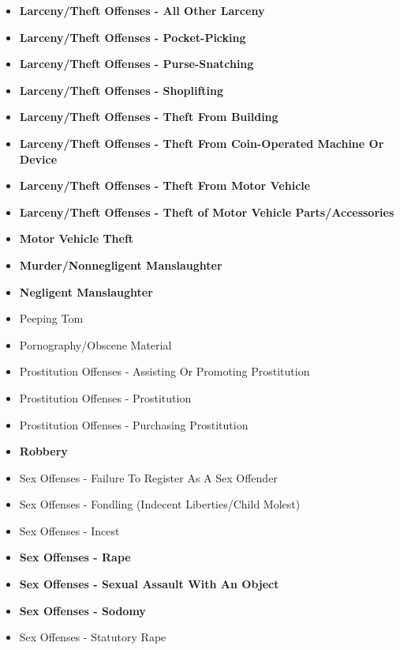 \documentclass[
]{krantz}
\begin{document}
\begin{itemize}
\item
  \textbf{Larceny/Theft Offenses - All Other Larceny}
\item
  \textbf{Larceny/Theft Offenses - Pocket-Picking}
\item
  \textbf{Larceny/Theft Offenses - Purse-Snatching}
\item
  \textbf{Larceny/Theft Offenses - Shoplifting}
\item
  \textbf{Larceny/Theft Offenses - Theft From Building}
\item
  \textbf{Larceny/Theft Offenses - Theft From Coin-Operated
  Machine Or Device}
\item
  \textbf{Larceny/Theft Offenses - Theft From Motor Vehicle}
\item
  \textbf{Larceny/Theft Offenses - Theft of Motor Vehicle
  Parts/Accessories}\\
\item
  \textbf{Motor Vehicle Theft}
\item
  \textbf{Murder/Nonnegligent Manslaughter}
\item
  \textbf{Negligent Manslaughter}
\item
  Peeping Tom\\
\item
  Pornography/Obscene Material\\
\item
  Prostitution Offenses - Assisting Or Promoting
  Prostitution\\
\item
  Prostitution Offenses - Prostitution\\
\item
  Prostitution Offenses - Purchasing Prostitution\\
\item
  \textbf{Robbery}\\
\item
  Sex Offenses - Failure To Register As A Sex Offender\\
\item
  Sex Offenses - Fondling (Indecent Liberties/Child
  Molest)\\
\item
  Sex Offenses - Incest\\
\item
  \textbf{Sex Offenses - Rape}
\item
  \textbf{Sex Offenses - Sexual Assault With An Object}
\item
  \textbf{Sex Offenses - Sodomy}
\item
  Sex Offenses - Statutory Rape\\

\end{itemize}
\end{document}
